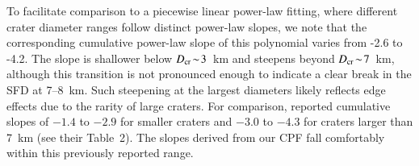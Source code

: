 \documentclass[preprint,11pt,3p,times,authoryear]{elsarticle}
\begin{document}
%
%
%

To facilitate comparison to a piecewise linear power-law fitting, where different crater diameter ranges follow distinct power-law slopes, we note that the corresponding cumulative power-law slope of this polynomial varies from -2.6 to -4.2.
The slope is shallower below $D_{\rm cr}\!\sim\!3$~km and steepens beyond $D_{\rm cr}\!\sim\!7$~km, although this transition is not pronounced enough to indicate a clear break in the SFD at 7--8~km. Such steepening at the largest diameters likely reflects edge effects due to the rarity of large craters.
For comparison, \citet{Kirchoff2009} reported cumulative slopes of $-1.4$ to $-2.9$
for smaller craters and $-3.0$ to $-4.3$ for craters larger than 7~km (see their Table~2). The slopes derived from our CPF fall comfortably within this previously reported range.\\
\end{document}
